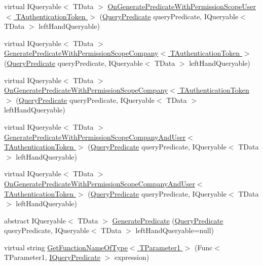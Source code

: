 \begin{DoxyCompactItemize}
\item 
virtual I\+Queryable$<$ T\+Data $>$ \hyperlink{classCqrs_1_1Repositories_1_1Queries_1_1QueryBuilder_a314592206fd5d2a25866227cc547dd6b}{On\+Generate\+Predicate\+With\+Permission\+Scope\+User$<$ T\+Authentication\+Token $>$} (\hyperlink{classCqrs_1_1Repositories_1_1Queries_1_1QueryPredicate}{Query\+Predicate} query\+Predicate, I\+Queryable$<$ T\+Data $>$ left\+Hand\+Queryable)
\item 
virtual I\+Queryable$<$ T\+Data $>$ \hyperlink{classCqrs_1_1Repositories_1_1Queries_1_1QueryBuilder_aa1341909b87629158efa619af12cec5f}{Generate\+Predicate\+With\+Permission\+Scope\+Company$<$ T\+Authentication\+Token $>$} (\hyperlink{classCqrs_1_1Repositories_1_1Queries_1_1QueryPredicate}{Query\+Predicate} query\+Predicate, I\+Queryable$<$ T\+Data $>$ left\+Hand\+Queryable)
\item 
virtual I\+Queryable$<$ T\+Data $>$ \hyperlink{classCqrs_1_1Repositories_1_1Queries_1_1QueryBuilder_a1f036fd121ef5181f846e6da72dddbad}{On\+Generate\+Predicate\+With\+Permission\+Scope\+Company$<$ T\+Authentication\+Token $>$} (\hyperlink{classCqrs_1_1Repositories_1_1Queries_1_1QueryPredicate}{Query\+Predicate} query\+Predicate, I\+Queryable$<$ T\+Data $>$ left\+Hand\+Queryable)
\item 
virtual I\+Queryable$<$ T\+Data $>$ \hyperlink{classCqrs_1_1Repositories_1_1Queries_1_1QueryBuilder_a49c0626c4137be11afbb1e398294e474}{Generate\+Predicate\+With\+Permission\+Scope\+Company\+And\+User$<$ T\+Authentication\+Token $>$} (\hyperlink{classCqrs_1_1Repositories_1_1Queries_1_1QueryPredicate}{Query\+Predicate} query\+Predicate, I\+Queryable$<$ T\+Data $>$ left\+Hand\+Queryable)
\item 
virtual I\+Queryable$<$ T\+Data $>$ \hyperlink{classCqrs_1_1Repositories_1_1Queries_1_1QueryBuilder_aded996242ae739440270f227ad777635}{On\+Generate\+Predicate\+With\+Permission\+Scope\+Company\+And\+User$<$ T\+Authentication\+Token $>$} (\hyperlink{classCqrs_1_1Repositories_1_1Queries_1_1QueryPredicate}{Query\+Predicate} query\+Predicate, I\+Queryable$<$ T\+Data $>$ left\+Hand\+Queryable)
\item 
abstract I\+Queryable$<$ T\+Data $>$ \hyperlink{classCqrs_1_1Repositories_1_1Queries_1_1QueryBuilder_aa38989a8b4808c7c73e7cf038b535ea7}{Generate\+Predicate} (\hyperlink{classCqrs_1_1Repositories_1_1Queries_1_1QueryPredicate}{Query\+Predicate} query\+Predicate, I\+Queryable$<$ T\+Data $>$ left\+Hand\+Queryable=null)
\item 
virtual string \hyperlink{classCqrs_1_1Repositories_1_1Queries_1_1QueryBuilder_a09b5db1f6e86d02c04f132080e88aa38}{Get\+Function\+Name\+Of\+Type$<$ T\+Parameter1 $>$} (Func$<$ T\+Parameter1, \hyperlink{interfaceCqrs_1_1Repositories_1_1Queries_1_1IQueryPredicate}{I\+Query\+Predicate} $>$ expression)

\end{DoxyCompactItemize}
